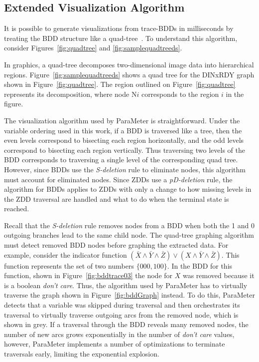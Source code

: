 {\subsection{Extended Visualization Algorithm} It is possible to generate visualizations from trace-BDDs in milliseconds by treating the BDD structure like a quad-tree~\cite{price:08:pact}.  To understand this algorithm, consider Figures~\ref{fig:quadtree} and \ref{fig:samplequadtreeds}.

In graphics, a quad-tree decomposes two-dimensional image data into hierarchical regions. Figure~\ref{fig:samplequadtreeds} shows a quad tree for the DINxRDY graph shown in Figure~\ref{fig:quadtree}.  The region outlined on Figure~\ref{fig:quadtree} represents its decomposition, where node N$i$ corresponds to the region $i$ in the figure.

The visualization algorithm used by ParaMeter is straightforward. Under the variable ordering used in this work, if a BDD is traversed like a tree, then the even levels correspond to bisecting each region horizontally, and the odd levels correspond to bisecting each region vertically.  Thus traversing two levels of the BDD corresponds to traversing a single level of the corresponding quad tree.  However, since BDDs use the \textit{S-deletion} rule to eliminate nodes, this algorithm must account for eliminated nodes.  Since ZDDs use a \textit{pD-deletion} rule, the algorithm for BDDs applies to ZDDs with only a change to how missing levels in the ZDD traversal are handled and what to do when the terminal state is reached.

Recall that the \textit{S-deletion} rule removes nodes from a BDD when both the 1 and 0 outgoing branches lead to the same child node.  The quad-tree graphing algorithm must detect removed BDD nodes before graphing the extracted data.  For example, consider the indicator function $(\bar{X}\land\bar{Y}\land\bar{Z})\lor(X\land\bar{Y}\land\bar{Z})$. This function represents the set of two numbers $\{000, 100\}$.  In the BDD for this function, shown in Figure~\ref{fig:bddtrace03} the node for $X$ was removed because it is a boolean \textit{don't care}. Thus, the algorithm used by ParaMeter has to virtually traverse the graph shown in Figure~\ref{fig:bddGraph} instead.  To do this, ParaMeter detects that a variable was skipped during traversal and then orchestrates its traversal to virtually traverse outgoing arcs from the removed node, which is shown in grey.  If a traversal through the BDD reveals many removed nodes, the number of new arcs grows exponentially in the number of \textit{don't care} values, however, ParaMeter implements a number of optimizations to terminate traversals early, limiting the exponential explosion.

}
